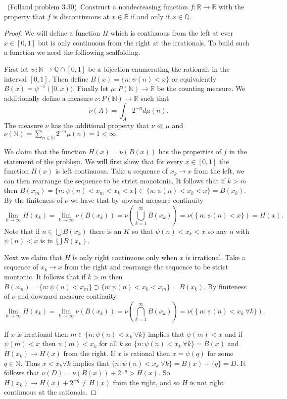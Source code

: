 \documentclass[11pt]{amsart}
\theoremstyle{definition}
\numberwithin{theorem}{section}
\numberwithin{definition}{section}
\numberwithin{equation}{section}
\def\reals{{\mathbb R}}
\def\rationals{{\mathbb Q}}
\begin{document}
\medskip {}\ (Folland problem 3.30)\ 
Construct a nondecreasing function $f:\reals\to\reals$
with the property that $f$ is discontinuous at $x\in\reals$
if and only if $x\in\rationals$.
\begin{proof}
We will define a function $H$ which is continuous from the left at ever $x \in [0,1]$ but is only continuous from the right at the irrationals. To build such a function we need the folliowing scaffolding.

First let $\psi: \mathbb{N} \to \mathbb{Q} \cap [0,1]$ be a bijection enumerating the rationals in the interval $[0,1]$. Then define $B(x) = \{n : \psi(n)< x\}$ or equivalently $B(x) = \psi^{-1}([0,x))$. Finally let $\mu: P(\mathbb{N}) \to \overline{\mathbb{R}}$ be the counting measure. We additionally define a measure $\nu: P(\mathbb{N}) \to \mathbb{R}$ such that 
$$\nu(A) = \int_A 2^{-n} d \mu(n).$$
The measure $\nu$ has the additional property that $\nu \ll \mu$ and $\nu(\mathbb{N}) = \sum_{n \in \mathbb{N}} 2^{-n} \mu({n}) = 1 < \infty.$

We claim that the function $H(x) = \nu(B(x))$ has the properties of $f$ in the statement of the problem. We will first show that for
every $x \in [0,1]$ the function $H(x)$ is left continuous. Take a sequence of $x_k \to x$ from the left, we can then rearrange the sequence to be strict monotonic. It follows that if $k > m$ then $B(x_m) = \{n: \psi(n) < x_m < x_k < x\} \subset \{n: \psi(n) < x_k < x\} = B(x_k)$. By the 
finiteness of $\nu$ we have that by upward measure continuity
$$\lim_{k \to \infty} H(x_k) = \lim_{k \to \infty} \nu(B(x_k)) = \nu\left(\bigcup_{k=1}^\infty B(x_k) \right) = \nu(\left \{n: \psi(n) < x\}\right ) = H(x).$$
Note that if $ n \in \bigcup B(x_k)$  there is an $K$ so that $\psi(n) < x_k < x $ so any $n$ with $\psi(n) < x$ is in $\bigcup B(x_k).$

Next we claim that $H$ is only right continuous only when $x$ is irrational. Take a sequence of $x_k \to x$ from the right and rearrange the sequence to be  strict montonic. It follows that if $k > m$ then $B(x_m) = \{n: \psi(n) < x_m\} \supset \{n: \psi(n) < x_k < x_m\} = B(x_k)$. By finiteness of $\nu$ and downard measure continuity
$$\lim_{k \to \infty} H(x_k) = \lim_{k \to \infty} \nu(B(x_k)) = \nu\left(\bigcap_{k=1}^\infty B(x_k) \right) = \nu(\left \{n: \psi(n) < x_k\ \forall k\}\right ).$$

If $x$ is irrational then $m \in \{n: \psi(n) < x_k\ \forall k\}$ implies that $\psi(m) < x$ and if $\psi(m) < x$ then $\psi(m) < x_k$ for all $k$ so $\{n: \psi(n) < x_k\ \forall k\} = B(x)$ and $H(x_k) \to H(x)$ from the right. If $x$ is rational then $x= \psi(q)$ for some
$q \in \mathbb{N}.$ Thus $x < x_k \forall k$ implies that $\{n: \psi(n) < x_k\ \forall k\} = B(x) + \{q\} = D$. It follows that $\nu(D) = \nu(B(x)) + 2^{-q} > H(x)$. So $H(x_k) \to H(x) + 2^{-q} \neq H(x)$ from the right, and so $H$ is not right continuous at the rationals.


\end{proof}
\end{document}
